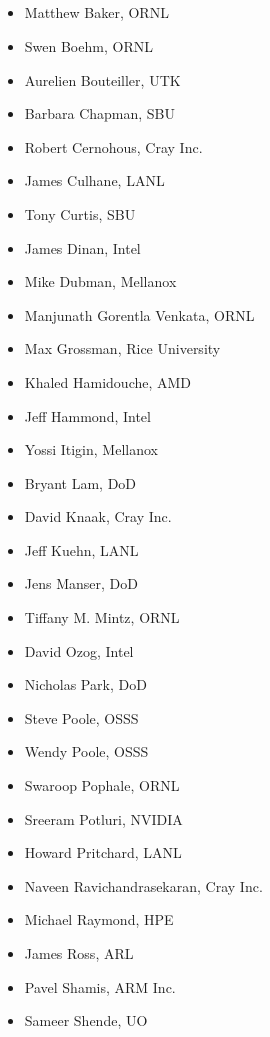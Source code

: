 \subsection*{}
\begin{multicols}{2}
\begin{itemize}
\setlength\itemsep{0.1em}
\item Matthew Baker, \ac{ORNL}
\item Swen Boehm, \ac{ORNL}
\item Aurelien Bouteiller, \ac{UTK}
\item Barbara Chapman, \ac{SBU}
\item Robert Cernohous, Cray Inc.
\item James Culhane, \ac{LANL}
\item Tony Curtis, \ac{SBU}
\item James Dinan, Intel
\item Mike Dubman, Mellanox
\item Manjunath Gorentla Venkata, \ac{ORNL}
\item Max Grossman, Rice University
\item Khaled Hamidouche, \ac{AMD}
\item Jeff Hammond, Intel
\item Yossi Itigin, Mellanox
\item Bryant Lam, \ac{DoD}
\item David Knaak, Cray Inc.
\item Jeff Kuehn, \ac{LANL}
\item Jens Manser, \ac{DoD}
\item Tiffany M. Mintz, \ac{ORNL}
\item David Ozog, Intel
\item Nicholas Park, \ac{DoD}
\item Steve Poole, \ac{OSSS}
\item Wendy Poole, \ac{OSSS}
\item Swaroop Pophale, \ac{ORNL}
\item Sreeram Potluri, NVIDIA
\item Howard Pritchard, \ac{LANL}
\item Naveen Ravichandrasekaran, Cray Inc.
\item Michael Raymond, \ac{HPE}
\item James Ross, \ac{ARL}
\item Pavel Shamis, ARM Inc.
\item Sameer Shende, \ac{UO}
\end{itemize}
\end{multicols}

